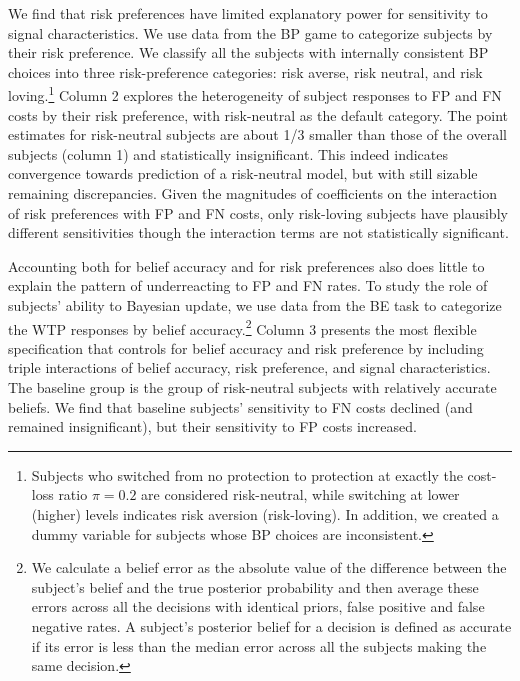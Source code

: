 \documentclass[12pt,a4paper]{article}
\begin{document}
We find that risk preferences have limited explanatory power for sensitivity to signal characteristics. We use data from the BP game to categorize subjects by their risk preference. We classify all the subjects with internally consistent BP choices into three risk-preference categories: risk averse, risk neutral, and risk loving.\footnote{Subjects who switched from no protection to protection at exactly the cost-loss ratio $\pi=0.2$ are considered risk-neutral, while switching at lower (higher) levels indicates risk aversion (risk-loving). In addition, we created a dummy variable for subjects whose BP choices are inconsistent.}  Column 2 explores the heterogeneity of subject responses to FP and FN costs by their risk preference, with risk-neutral as the default category. The point estimates for risk-neutral subjects are about 1/3 smaller than those of the overall subjects (column 1) and statistically insignificant. This indeed indicates convergence towards prediction of a risk-neutral model, but with still sizable remaining discrepancies. Given the magnitudes of coefficients on the interaction of risk preferences with FP and FN costs, only risk-loving subjects have plausibly different sensitivities though the interaction terms are not statistically significant.

Accounting both for belief accuracy and for risk preferences also does little to explain the pattern of underreacting to FP and FN rates. To study the role of subjects' ability to Bayesian update, we use data from the BE task to categorize the WTP responses by belief accuracy.\footnote{We calculate a belief error as the absolute value of the difference between the subject's belief and the true posterior probability and then average these errors across all the decisions with identical priors, false positive and false negative rates. A subject's posterior belief for a decision is defined as accurate if its error is less than the median error across all the subjects making the same decision.} Column 3 presents the most flexible specification that controls for belief accuracy and risk preference by including triple interactions of belief accuracy, risk preference, and signal characteristics. The baseline group is the group of risk-neutral subjects with relatively accurate beliefs. We find that baseline subjects' sensitivity to FN costs declined (and remained insignificant), but their sensitivity to FP costs increased.
\end{document}

